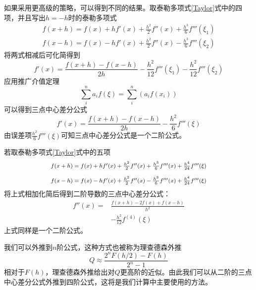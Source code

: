 \documentclass[UTF8,a4paper,10pt]{ctexart}
\begin{document}
\begin{multicols}{2}
            如果采用更高级的策略，可以得到不同的结果。取泰勒多项式\eqref{Taylor}式中的四项，并且写出$h=-h$时的泰勒多项式
            \begin{equation*}
                \begin{array}{l}
                    f(x+h) = f(x) + hf'(x) + \frac{h^2}{2}f''(x) + \frac{h^3}{6}f'''(\xi_1)\\
                    f(x-h) = f(x) - hf'(x) + \frac{h^2}{2}f''(x) - \frac{h^3}{6}f'''(\xi_2)
                \end{array}
            \end{equation*}
            将两式相减后可化简得到
            \begin{equation*}
                f'(x) = \frac{f(x+h)-f(x-h)}{2h} - \frac{h^2}{12}f'''(\xi_1) - \frac{h^2}{12}f'''(\xi_2)
            \end{equation*}
            应用推广介值定理
            \begin{equation}
                \sum_i^na_if(\xi) = \sum_i^n(a_if(x_i))
            \end{equation}
            可以得到三点中心差分公式
            \begin{equation*}
                f'(x) = \frac{f(x+h)-f(x-h)}{2h} - \frac{h^2}{6}f'''(\xi)
            \end{equation*}
            由误差项$\frac{h^2}{6}f'''(\xi)$可知三点中心差分公式是一个二阶公式。\par
            若取泰勒多项式\eqref{Taylor}式中的五项
            \begin{equation*}
                \begin{footnotesize}
                    \begin{array}{l}
                        f(x+h) = f(x) + hf'(x) + \frac{h^2}{2}f''(x) + \frac{h^3}{6}f'''(x) + \frac{h^4}{24}f'''(\xi)\\
                        \\
                        f(x-h) = f(x) - hf'(x) + \frac{h^2}{2}f''(x) - \frac{h^3}{6}f'''(x) + \frac{h^4}{24}f'''(\xi)
                    \end{array}
                \end{footnotesize}
            \end{equation*}
            将上式相加化简后得到二阶导数的三点中心差分公式：
            \begin{equation}\label{three-point center difference_2}
                \begin{split}
                    f''(x) = &\frac{f(x+h)-2f(x)+f(x-h)}{h^2}\\
                    &-\frac{h^2}{12}f^{(4)}(\xi)
                \end{split}
            \end{equation}
            上式同样是一个二阶公式。\par
            我们可以外推到$n$阶公式，这种方式也被称为理查德森外推
            \begin{equation}
                Q\approx\frac{2^nF(h/2)-F(h)}{2^n-1}
            \end{equation}
            相对于$F(h)$，理查德森外推给出对$Q$更高阶的近似。由此我们可以从二阶的三点中心差分公式外推到四阶公式，这将是我们计算中主要使用的方法。

\end{multicols}
\end{document}
